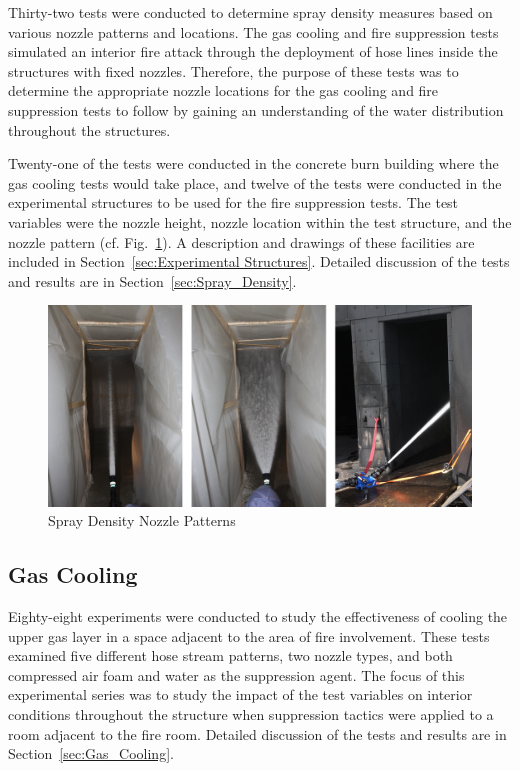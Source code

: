 \documentclass[12pt,oneside]{book}
\begin{document}
Thirty-two tests were conducted to determine spray density measures based on various nozzle patterns and locations. The gas cooling and fire suppression tests simulated an interior fire attack through the deployment of hose lines inside the structures with fixed nozzles. Therefore, the purpose of these tests was to determine the appropriate nozzle locations for the gas cooling and fire suppression tests to follow by gaining an understanding of the water distribution throughout the structures.

Twenty-one of the tests were conducted in the concrete burn building where the gas cooling tests would take place, and twelve of the tests were conducted in the experimental structures to be used for the fire suppression tests. The test variables were the nozzle height, nozzle location within the test structure, and the nozzle pattern (cf. Fig.~\ref{fig:Spray_Density_Nozzle_Patterns}). A description and drawings of these facilities are included in Section~\ref{sec:Experimental Structures}. Detailed discussion of the tests and results are in Section~\ref{sec:Spray_Density}.

\begin{figure}[!ht]
	\includegraphics[width=6in]{../Figures/Pictures/Flows}
	\caption{Spray Density Nozzle Patterns}
	\label{fig:Spray_Density_Nozzle_Patterns}
\end{figure}

\subsection{Gas Cooling}
\label{sec:desc_Gas_Cooling}

Eighty-eight experiments were conducted to study the effectiveness of cooling the upper gas layer in a space adjacent to the area of fire involvement. These tests examined five different hose stream patterns, two nozzle types, and both compressed air foam and water as the suppression agent. The focus of this experimental series was to study the impact of the test variables on interior conditions throughout the structure when suppression tactics were applied to a room adjacent to the fire room. Detailed discussion of the tests and results are in Section~\ref{sec:Gas_Cooling}.
\end{document}
